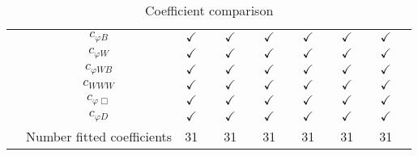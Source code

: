 \documentclass{article}
\begin{document}
\begin{table}[H]
\begin{tabular}{|c|c|c|c|c|c|c|c|c|c|c|c|c|c|}
 & $c_{\varphi B}$ & $\checkmark$ &  & $\checkmark$ &  & $\checkmark$ &  & $\checkmark$ &  & $\checkmark$ &  & $\checkmark$ & \\ \cline{2-14}
 & $c_{\varphi W}$ & $\checkmark$ &  & $\checkmark$ &  & $\checkmark$ &  & $\checkmark$ &  & $\checkmark$ &  & $\checkmark$ & \\ \cline{2-14}
 & $c_{\varphi WB}$ & $\checkmark$ &  & $\checkmark$ &  & $\checkmark$ &  & $\checkmark$ &  & $\checkmark$ &  & $\checkmark$ & \\ \cline{2-14}
 & $c_{WWW}$ & $\checkmark$ &  & $\checkmark$ &  & $\checkmark$ &  & $\checkmark$ &  & $\checkmark$ &  & $\checkmark$ & \\ \cline{2-14}
 & $c_{\varphi \Box}$ & $\checkmark$ &  & $\checkmark$ &  & $\checkmark$ &  & $\checkmark$ &  & $\checkmark$ &  & $\checkmark$ & \\ \cline{2-14}
 & $c_{\varphi D}$ & $\checkmark$ &  & $\checkmark$ &  & $\checkmark$ &  & $\checkmark$ &  & $\checkmark$ &  & $\checkmark$ & 
\\ \hline
\hline & Number fitted coefficients & 31 &  & 31 &  & 31 &  & 31 &  & 31 &  & 31 &  \\ \hline
\end{tabular}
\caption{Coefficient comparison}
\end{table}
\end{document}

